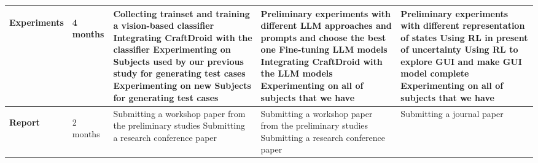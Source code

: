 \begin{table}[h!]
\begin{tabular}{|m{1cm}|m{1cm}|p{4cm}|p{4cm}|p{4cm}|}
		\hline
		\begin{sideways}\textbf{\textbf{Experiments}}\end{sideways} & \begin{sideways}4 months\end{sideways} & Collecting trainset and training a vision-based classifier             Integrating CraftDroid with the classifier             Experimenting on Subjects used by our previous study for generating test cases             Experimenting on new Subjects for generating test cases & Preliminary experiments with different LLM approaches and prompts and choose the best one             Fine-tuning LLM models             Integrating CraftDroid with the LLM models             Experimenting on all of subjects that we have & Preliminary experiments with different representation of states             Using RL in present of uncertainty             Using RL to explore GUI and make GUI model complete             Experimenting on all of subjects that we have  \\ 
		\hline
		\begin{sideways}\textbf{\textbf{Report}}\end{sideways}      & \begin{sideways}2 months\end{sideways} & Submitting a workshop paper from the preliminary studies             Submitting a research conference paper                                                                                                                                                                                                          & Submitting a workshop paper from the preliminary studies             Submitting a research conference paper                                                                                                                                   & Submitting a journal paper                                                                                                             \\
		\hline
	\end{tabular}
\end{table}